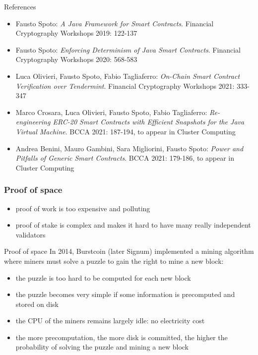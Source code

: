 \documentclass[11pt]{beamer}  %
\begin{document}
\begin{frame}{References}
  \begin{itemize}
  \item Fausto Spoto:
\emph{A Java Framework for Smart Contracts}. Financial Cryptography Workshops 2019: 122-137
  \item Fausto Spoto:
\emph{Enforcing Determinism of Java Smart Contracts}. Financial Cryptography Workshops 2020: 568-583
  \item Luca Olivieri, Fausto Spoto, Fabio Tagliaferro:
\emph{On-Chain Smart Contract Verification over Tendermint}. Financial Cryptography Workshops 2021: 333-347
  \item Marco Crosara, Luca Olivieri, Fausto Spoto, Fabio Tagliaferro:
\emph{Re-engineering ERC-20 Smart Contracts with Efficient Snapshots for the Java Virtual Machine}. BCCA 2021: 187-194, to appear in Cluster Computing
  \item Andrea Benini, Mauro Gambini, Sara Migliorini, Fausto Spoto:
\emph{Power and Pitfalls of Generic Smart Contracts}. BCCA 2021: 179-186, to appear in Cluster Computing
  \end{itemize}
\end{frame}

\begin{frame}\frametitle{Proof of space}

  \begin{itemize}
  \item proof of work is too expensive and polluting
  \item proof of stake is complex and makes it hard to have many really independent validators
  \end{itemize}

  \medskip

  \begin{greenbox}{Proof of space}
    In 2014, Burstcoin (later Signum) implemented a mining algorithm
    where miners must solve a puzzle to gain the right to mine a new block:
    \begin{itemize}
    \item the puzzle is too hard to be computed for each new block
    \item the puzzle becomes very simple if some information is precomputed and stored on disk
    \item the CPU of the miners remains largely idle: no electricity cost
    \item the more precomputation, the more disk is committed, the higher the probability of solving the puzzle and mining a new block
    \end{itemize}
  \end{greenbox}
  
\end{frame}
\end{document}
